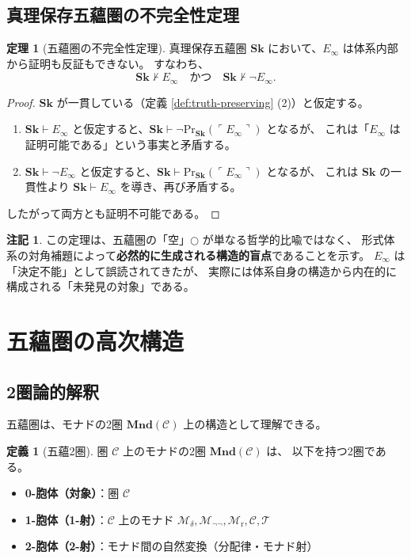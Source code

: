 \documentclass[11pt,a4paper]{article}
\theoremstyle{definition}
\newtheorem{definition}{定義}[section]
\newtheorem{theorem}{定理}[section]
\newtheorem{remark}{注記}[section]
\newcommand{\Sk}{\mathbf{Sk}}
\newcommand{\Mdelta}{\mathcal{M}_{\delta}}
\newcommand{\Mneg}{\mathcal{M}_{\neg\neg}}
\newcommand{\Mr}{\mathcal{M}_{\mathrm{r}}}
\newcommand{\Mc}{\mathcal{C}}
\newcommand{\T}{\mathcal{T}}
\newcommand{\PrSk}{\mathrm{Pr}_{\Sk}}
\newcommand{\Einf}{E_{\infty}}
\begin{document}
\subsection{真理保存五蘊圏の不完全性定理}

\begin{theorem}[五蘊圏の不完全性定理]
真理保存五蘊圏 $\Sk$ において、$\Einf$ は体系内部から証明も反証もできない。
すなわち、
\begin{equation}
\Sk \nvdash \Einf \quad \text{かつ} \quad \Sk \nvdash \neg\Einf.
\end{equation}
\end{theorem}
\begin{proof}
$\Sk$ が一貫している（定義 \ref{def:truth-preserving} (2)）と仮定する。
\begin{enumerate}[label=(\roman*)]
\item $\Sk \vdash \Einf$ と仮定すると、$\Sk \vdash \neg\PrSk(\ulcorner \Einf \urcorner)$ となるが、
  これは「$\Einf$ は証明可能である」という事実と矛盾する。
\item $\Sk \vdash \neg\Einf$ と仮定すると、$\Sk \vdash \PrSk(\ulcorner \Einf \urcorner)$ となるが、
  これは $\Sk$ の一貫性より $\Sk \vdash \Einf$ を導き、再び矛盾する。
\end{enumerate}
したがって両方とも証明不可能である。
\end{proof}

\begin{remark}
この定理は、五蘊圏の「空」$\bigcirc$ が単なる哲学的比喩ではなく、
形式体系の対角補題によって\textbf{必然的に生成される構造的盲点}であることを示す。
$\Einf$ は「決定不能」として誤読されてきたが、
実際には体系自身の構造から内在的に構成される「未発見の対象」である。
\end{remark}

\section{五蘊圏の高次構造}

\subsection{2圏論的解釈}

五蘊圏は、モナドの2圏 $\mathbf{Mnd}(\mathcal{C})$ 上の構造として理解できる。

\begin{definition}[五蘊2圏]
圏 $\mathcal{C}$ 上のモナドの2圏 $\mathbf{Mnd}(\mathcal{C})$ は、
以下を持つ2圏である。

\begin{itemize}
\item \textbf{0-胞体（対象）}：圏 $\mathcal{C}$
\item \textbf{1-胞体（1-射）}：$\mathcal{C}$ 上のモナド
  $\Mdelta, \Mneg, \Mr, \Mc, \T$
\item \textbf{2-胞体（2-射）}：モナド間の自然変換（分配律・モナド射）
\end{itemize}
\end{definition}
\end{document}
